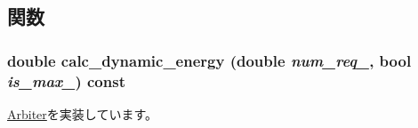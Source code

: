 \subsection{関数}
\hypertarget{classMatrixArbiter_adf7ecbfcfee50be4847889bf0bc725b1}{
\subsubsection[{calc\_\-dynamic\_\-energy}]{\setlength{\rightskip}{0pt plus 5cm}double calc\_\-dynamic\_\-energy (double {\em num\_\-req\_\-}, \/  bool {\em is\_\-max\_\-}) const}}
\label{classMatrixArbiter_adf7ecbfcfee50be4847889bf0bc725b1}


\hyperlink{classArbiter_a11ad46c0a5f20df98190b479117a7dee}{Arbiter}を実装しています。


